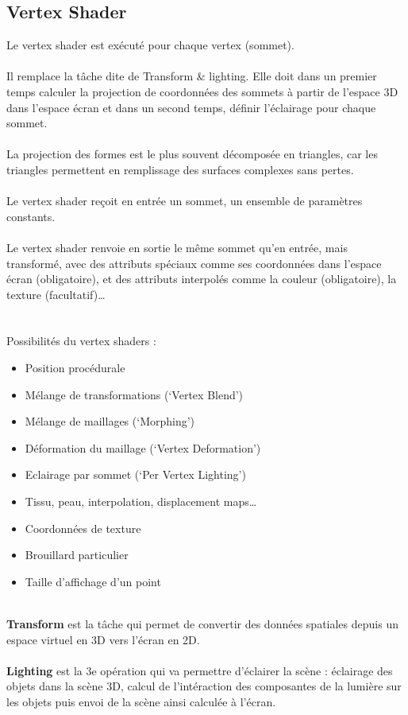 \subsection{Vertex Shader}
Le vertex shader est exécuté pour chaque vertex (sommet).
\\\\
Il remplace la tâche dite de Transform \& lighting. Elle doit dans un premier temps calculer la projection de coordonnées des sommets à partir de l'espace 3D dans l'espace écran et dans un second temps, définir l’éclairage pour chaque sommet.
\\\\
La projection des formes est le plus souvent décomposée en triangles, car les triangles permettent en remplissage des surfaces complexes sans pertes.
\\\\
Le vertex shader reçoit en entrée un sommet, un ensemble  de paramètres constants.
\\\\
Le vertex shader renvoie en sortie le même sommet qu’en entrée, mais transformé, avec des attributs spéciaux comme ses coordonnées dans l’espace écran (obligatoire), et des attributs interpolés comme la couleur (obligatoire), la texture (facultatif)…
\\\\\\
Possibilités du vertex shaders :
\begin{itemize}
  \item Position procédurale
  \item Mélange de transformations (‘Vertex Blend’)
  \item Mélange de maillages (‘Morphing’) 
  \item Déformation du maillage (‘Vertex Deformation’)
  \item Eclairage par sommet (‘Per Vertex Lighting’)
  \item Tissu, peau, interpolation, displacement maps…
  \item Coordonnées de texture
  \item Brouillard particulier
  \item Taille d’affichage d’un point
  
\end{itemize} 

\textbf{\\Transform} est la tâche qui permet de convertir des données spatiales depuis un espace virtuel en 3D vers l'écran en 2D.
\\\\
\textbf{Lighting} est la 3e opération qui va permettre d'éclairer la scène : éclairage des objets dans la scène 3D, calcul de l'intéraction des composantes de la lumière sur les objets puis envoi de la scène ainsi calculée à l'écran.

